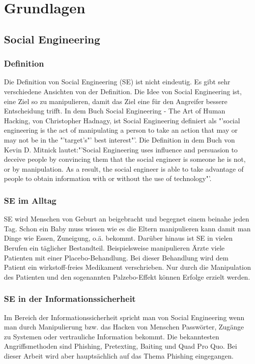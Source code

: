 
\chapter {Grundlagen}  %
\label{cha:grundlagen} %

\section{Social Engineering} %
\label {sec:Social Engineering} %
	\subsection{Definition}
	Die Definition von Social Engineering (SE) ist nicht eindeutig. Es gibt sehr verschiedene Ansichten von der Definition. Die Idee von Social Engineering ist, eine Ziel so zu manipulieren, damit das Ziel eine für den Angreifer bessere Entscheidung trifft. In dem Buch Social Engineering - The Art of Human Hacking, von Christopher Hadnagy, ist Social Engineering definiert als "'social engineering is the act of manipulating a person to take an action that may or may not be in the "'target’s"' best interest"'\cite{ArtOfHumanHacking}. Die Definition in dem Buch von Kevin D. Mitnick lautet:"'Social Engineering uses influence and persuasion to deceive people by convincing them that the social engineer is someone he is not, or by manipulation. As a result, the social engineer is able to take advantage of people to obtain information with or without the use of technology"'\cite{ArtOfDeception}.\\
	
	\subsection{SE im Alltag}
	SE wird Menschen von Geburt an beigebracht und begegnet einem beinahe jeden Tag. Schon ein Baby muss wissen wie es die Eltern manipulieren kann damit man Dinge wie Essen, Zuneigung, o.ä. bekommt. Darüber hinaus ist SE in vielen Berufen ein täglicher Bestandteil. Beispielsweise manipulieren Ärzte viele Patienten mit einer Placebo-Behandlung. Bei dieser Behandlung wird dem Patient ein wirkstoff-freies Medikament verschrieben. Nur durch die Manipulation des Patienten und den sogenannten Palzebo-Effekt können Erfolge erzielt werden.\\
	
	\subsection{SE in der Informationssicherheit}
	Im Bereich der Informationssicherheit spricht man von Social Engineering wenn man durch Manipulierung bzw. das Hacken von Menschen Passwörter, Zugänge zu Systemen oder vertrauliche Information bekommt. Die bekanntesten Angriffsmethoden sind Phishing, Pretexting, Baiting und Quad Pro Quo. Bei dieser Arbeit wird aber hauptsächlich auf das Thema Phishing eingegangen.

